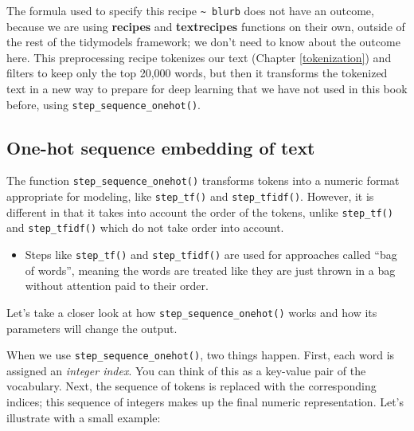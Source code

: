 \documentclass[
]{krantz}
\newenvironment{rmdblock}[1]
  {\begin{shaded*}
  \begin{itemize}[left = -1cm, labelsep = 1cm]
  \renewcommand{\labelitemi}{
    \raisebox{-.7\height}[0pt][0pt]{
      {\setkeys{Gin}{width=3em,keepaspectratio}\texttt{[image: images/\#1]}}
    }
  }
 
  \item
  }
  {
  \end{itemize}
  \end{shaded*}
  }
\newenvironment{rmdnote}
  {\begin{rmdblock}{note}}
  {\end{rmdblock}}
\begin{document}
The formula used to specify this recipe \texttt{\textasciitilde{}\ blurb} does not have an outcome, because we are using \textbf{recipes} and \textbf{textrecipes} functions on their own, outside of the rest of the tidymodels framework; we don't need to know about the outcome here.
This preprocessing recipe tokenizes our text (Chapter \ref{tokenization}) and filters to keep only the top 20,000 words, but then it transforms the tokenized text in a new way to prepare for deep learning that we have not used in this book before, using \texttt{step\_sequence\_onehot()}.

\hypertarget{onehotsequence}{%
\subsection{One-hot sequence embedding of text}\label{onehotsequence}}

The function \texttt{step\_sequence\_onehot()} transforms tokens into a numeric format appropriate for modeling, like \texttt{step\_tf()} and \texttt{step\_tfidf()}. However, it is different in that it takes into account the order of the tokens, unlike \texttt{step\_tf()} and \texttt{step\_tfidf()} which do not take order into account.

\begin{rmdnote}
Steps like \texttt{step\_tf()} and \texttt{step\_tfidf()} are used for
approaches called ``bag of words'', meaning the words are treated like
they are just thrown in a bag without attention paid to their order.
\end{rmdnote}

Let's take a closer look at how \texttt{step\_sequence\_onehot()} works and how its parameters will change the output.

When we use \texttt{step\_sequence\_onehot()}, two things happen. First, each word is assigned an \emph{integer index}. You can think of this as a key-value pair of the vocabulary. Next, the sequence of tokens is replaced with the corresponding indices; this sequence of integers makes up the final numeric representation. Let's illustrate with a small example:
\end{document}
